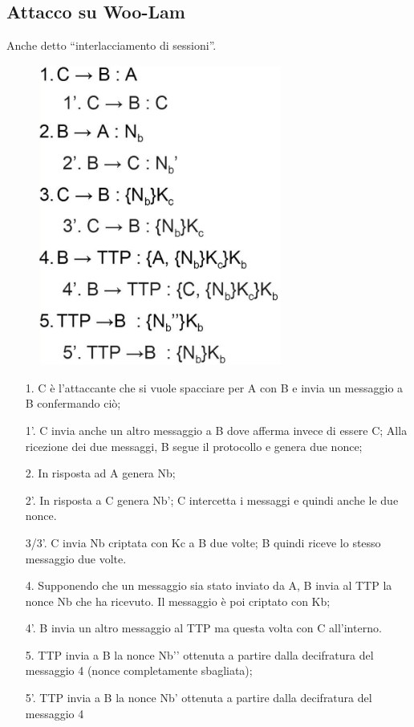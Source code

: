 \subsection{Attacco su Woo-Lam}

Anche detto “interlacciamento di sessioni”.
\begin{figure}[H]
    \centering
    \includegraphics[width=8cm, keepaspectratio]{capitoli/crittografia/imgs/mulan2.png}
\end{figure}
\begin{enumerate}
    \item[1.] C è l’attaccante che si vuole spacciare per A con
        B e invia un messaggio a B confermando ciò;
    \item[1'.] C invia anche un altro messaggio a B dove
        afferma invece di essere C; Alla ricezione dei due
        messaggi, B segue il protocollo e genera due nonce;
    \item[2.] In risposta ad A genera Nb;
    \item[2'.] In risposta a C genera Nb’;
        C intercetta i messaggi e quindi anche le due nonce.
    \item[3/3'.] C invia Nb criptata con Kc a B due volte;
        B quindi riceve lo stesso messaggio due volte.
    \item[4.] Supponendo che un messaggio sia stato inviato
        da A, B invia al TTP la nonce Nb che ha ricevuto. Il
        messaggio è poi criptato con Kb;
    \item[4'.] B invia un altro messaggio al TTP ma questa
        volta con C all’interno.
    \item[5.] TTP invia a B la nonce Nb’’ ottenuta a partire dalla
        decifratura del messaggio 4 (nonce completamente
        sbagliata);
    \item[5'.] TTP invia a B la nonce Nb’ ottenuta a partire dalla
        decifratura del messaggio 4
\end{enumerate}

